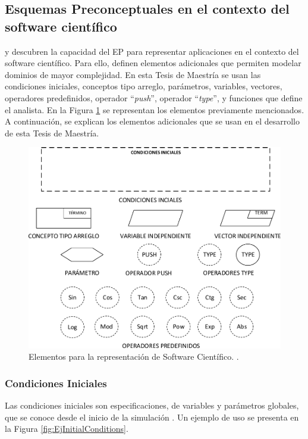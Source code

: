 \subsection{Esquemas Preconceptuales en el contexto del software científico}

\cite{JCalle} y \cite{norena2018det} descubren la capacidad del EP para representar aplicaciones en el contexto del software científico. Para ello, definen elementos adicionales que permiten modelar dominios de mayor complejidad. En esta Tesis de Maestría se usan las condiciones iniciales, conceptos tipo arreglo, parámetros, variables, vectores, operadores predefinidos, operador ``\textit{push}'', operador ``\textit{type}'',  y funciones que define el analista. En la Figura \ref{fig:NewElements} se representan los elementos previamente mencionados. A continuación, se explican los elementos adicionales que se usan en el desarrollo de esta Tesis de Maestría.

\begin{figure}[h]
	\centering%
	\includegraphics[width=0.9\linewidth]{Fig/NuevosElementosDelEP.pdf}%
	\caption[Elementos para la representación de Software Científico.]{Elementos para la representación de Software Científico. \citep{JCalle,norena2018det}.} \label{fig:NewElements}
\end{figure}

\subsubsection{Condiciones Iniciales}
Las condiciones iniciales son especificaciones, de variables y parámetros globales, que se conoce desde el inicio de la simulación \citep{norena2018det}. Un ejemplo de uso se presenta en la Figura \ref{fig:EjInitialConditions}.

